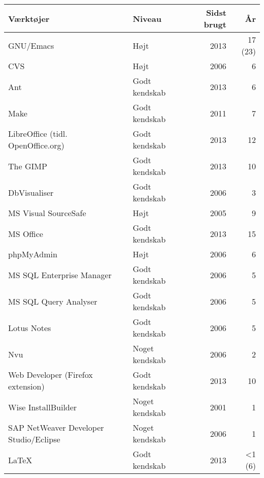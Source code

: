\documentclass[a4paper,11pt]{article}
\begin{document}
\bigskip
\begin{tabularx}{\textwidth}{X l r r}
  \textbf{Værktøjer}  & \textbf{Niveau}                     & \textbf{Sidst brugt}  & \textbf{År} \\
  \hline
  GNU/Emacs                               & Højt            & 2013                  & 17 (23)\\
  CVS                                     & Højt            & 2006                  &      6 \\
  Ant                                     & Godt kendskab   & 2013                  &      6 \\
  Make                                    & Godt kendskab   & 2011                  &      7 \\
  LibreOffice (tidl. OpenOffice.org)      & Godt kendskab   & 2013                  &     12 \\
  The GIMP                                & Godt kendskab   & 2013                  &     10 \\
  DbVisualiser                            & Godt kendskab   & 2006                  &      3 \\
  MS Visual SourceSafe                    & Højt            & 2005                  &      9 \\
  MS Office                               & Godt kendskab   & 2013                  &     15 \\
  phpMyAdmin                              & Højt            & 2006                  &      6 \\
  MS SQL Enterprise Manager               & Godt kendskab   & 2006                  &      5 \\
  MS SQL Query Analyser                   & Godt kendskab   & 2006                  &      5 \\
  Lotus Notes                             & Godt kendskab   & 2006                  &      5 \\
  Nvu                                     & Noget kendskab  & 2006                  &      2 \\
  Web Developer (Firefox extension)       & Godt kendskab   & 2013                  &     10 \\
  Wise InstallBuilder                     & Noget kendskab  & 2001                  &      1 \\
  SAP NetWeaver Developer Studio/Eclipse  & Noget kendskab  & 2006                  &      1 \\
  \LaTeX                                  & Godt kendskab   & 2013                  &  \textless1 (6)\\

\end{tabularx}
\end{document}
